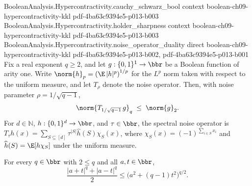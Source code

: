 \begin{theorem}
\proofstep
  {BooleanAnalysis.Hypercontractivity.cauchy_schwarz_bool}
  {context}
  {boolean-ch09-hypercontractivity-kkl}
  {pdf-4ba63c9394e5-p013-b003}
\proofstep
  {BooleanAnalysis.Hypercontractivity.holder_sharpness}
  {context}
  {boolean-ch09-hypercontractivity-kkl}
  {pdf-4ba63c9394e5-p013-b003}
\proofstep
  {BooleanAnalysis.Hypercontractivity.noise_operator_duality}
  {direct}
  {boolean-ch09-hypercontractivity-kkl}
  {pdf-4ba63c9394e5-p013-b002,
    pdf-4ba63c9394e5-p013-b001}
Fix a real exponent $q \ge 2$, and let $g : \{0,1\}^1 \to \bbr$ be a Boolean function of
arity one. Write $\norm{h}_p = \left(\E\,|h|^{p}\right)^{1/p}$ for the $L^p$ norm taken
with respect to the uniform measure, and let $T_\rho$ denote the noise operator. Then,
with noise parameter $\rho = 1/\sqrt{q-1}$,
\[
  \norm{T_{1/\sqrt{q-1}}\, g}_q \;\le\; \norm{g}_2 .
\] For $d\in\mathbb N$, $h:\{0,1\}^d\to\bbr$, and $\tau\in\bbr$, the spectral noise
operator is $T_\tau h(x)=\sum_{S\subseteq[d]}\tau^{|S|}\widehat h(S)\chi_S(x)$, where
$\chi_S(x)=(-1)^{\sum_{i\in S}x_i}$ and $\widehat h(S)=\E[h\chi_S]$ under the uniform
measure.
\end{theorem}

\begin{theorem}
\leanok
{}
For every $q\in\bbr$ with $2\le q$ and all $a,t\in\bbr$,
\[\frac{|a+t|^q+|a-t|^q}{2}\le\bigl(a^2+(q-1)t^2\bigr)^{q/2}.\]
\end{theorem}
